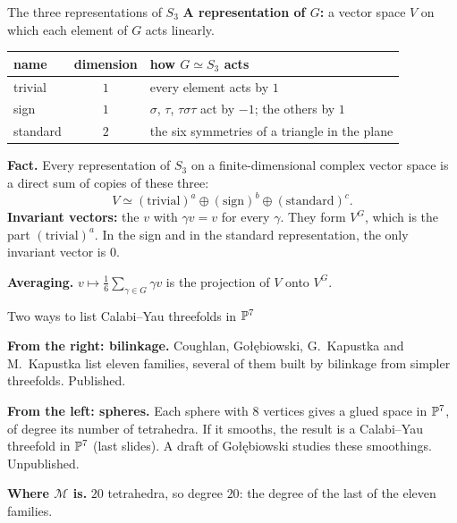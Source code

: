 \begin{frame}{The three representations of \(S_3\)}
\textbf{A representation of \(G\):} a vector space \(V\) on which each element of \(G\) acts linearly.
\begin{center}
\begin{tabular}{lcl}
name&dimension&how \(G\simeq S_3\) acts\\\hline
trivial&\(1\)&every element acts by \(1\)\\
sign&\(1\)&\(\sigma\), \(\tau\), \(\tau\sigma\tau\) act by \(-1\); the others by \(1\)\\
standard&\(2\)&the six symmetries of a triangle in the plane
\end{tabular}
\end{center}
\textbf{Fact.} Every representation of \(S_3\) on a finite-dimensional complex vector space is a direct sum of copies of these three:
\[
V\simeq(\text{trivial})^{a}\oplus(\text{sign})^{b}\oplus(\text{standard})^{c}.
\]
\textbf{Invariant vectors:} the \(v\) with \(\gamma v=v\) for every \(\gamma\). They form \(V^G\), which is the part \((\text{trivial})^{a}\). In the sign and in the standard representation, the only invariant vector is \(0\).
\par
\textbf{Averaging.} \(v\mapsto\frac16\sum_{\gamma\in G}\gamma v\) is the projection of \(V\) onto \(V^G\).
\end{frame}

\begin{frame}{Two ways to list Calabi--Yau threefolds in \(\mathbb P^7\)}
\begin{center}
\end{center}
\textbf{From the right: bilinkage.} Coughlan, Gołębiowski, G.~Kapustka and M.~Kapustka \cite{CGKK} list eleven families, several of them built by bilinkage from simpler threefolds. Published.
\par\medskip
\textbf{From the left: spheres.} Each sphere with \(8\) vertices gives a glued space in \(\mathbb P^7\), of degree its number of tetrahedra. If it smooths, the result is a Calabi--Yau threefold in \(\mathbb P^7\) (last slides). A draft of Gołębiowski studies these smoothings. Unpublished.
\par\medskip
\textbf{Where \(\mathcal M\) is.} \(20\) tetrahedra, so degree \(20\): the degree of the last of the eleven families.
\src{\textcolor{red}{Bilinkage is not explained in this talk. To decide: whether the unpublished draft is shown.}}
\end{frame}

